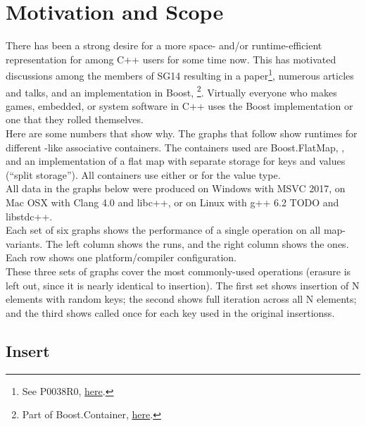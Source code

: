 \section{Motivation and Scope}

There has been a strong desire for a more space- and/or runtime-efficient
representation for  among C++ users for some time now.  This has
motivated discussions among the members of SG14 resulting in a
paper\footnote{See P0038R0,
  \href{http://www.open-std.org/jtc1/sc22/wg21/docs/papers/2015/p0038r0.html}{here}.},
numerous articles and talks, and an implementation in Boost,
\footnote{Part of Boost.Container,
  \href{http://www.boost.org/doc/libs/1_61_0/doc/html/container.html}{here}.}.
Virtually everyone who makes games, embedded, or system software in C++ uses
the Boost implementation or one that they rolled themselves.\\

Here are some numbers that show why.  The graphs that follow show runtimes for
different -like associative containers.  The containers used are
Boost.FlatMap, , and an implementation of a flat map with separate
 storage for keys and values (``split storage'').  All containers
use either  or 
for the value type.\\

All data in the graphs below were produced on Windows with MSVC 2017, on
Mac OSX with Clang 4.0 and libc++, or on Linux with g++ 6.2 TODO and libstdc++.\\

Each set of six graphs shows the performance of a single operation on all
map-variants.  The left column shows the  runs, and the right
column shows the  ones.  Each row shows one
platform/compiler configuration. \\

These three sets of graphs cover the most commonly-used operations (erasure is
left out, since it is nearly identical to insertion).  The first set shows
insertion of N elements with random keys; the second shows full iteration
across all N elements; and the third shows  called
once for each key used in the original insertionss.\\

\subsection{Insert}

